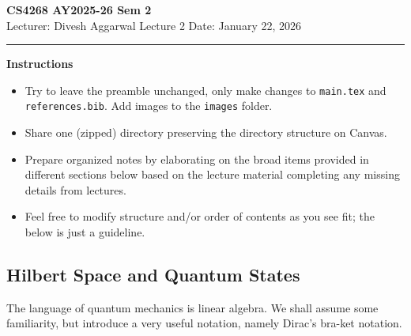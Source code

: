 



% 


\newpage
\noindent
\textbf{CS4268 AY2025-26 Sem 2}
\\
\noindent
Lecturer: Divesh Aggarwal
\hfill
Lecture 2                      %
\hfill
Date: January 22, 2026          %


\noindent
\rule{\textwidth}{1pt}

\medskip


\textbf{Instructions}\\
\begin{itemize}
    \item Try to leave the preamble unchanged, only make changes to \texttt{main.tex} and  \texttt{references.bib}. Add images to the \texttt{images} folder. 
    \item Share one (zipped) directory preserving the directory structure on Canvas. 
    \item Prepare organized notes by elaborating on the broad items provided in different sections below based on the lecture material completing any missing details from lectures.
    \item Feel free to modify structure and/or order of contents as you see fit; the below is just a guideline.
\end{itemize} 


\subsection{Hilbert Space and Quantum States}
The language of quantum mechanics is linear algebra. We shall assume some familiarity, but introduce a very useful notation, namely Dirac's bra-ket notation.

